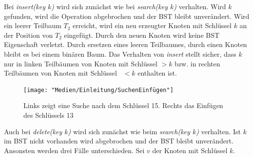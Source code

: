\documentclass[a4paper,12pt]{article}
\begin{document}
Bei \textit{insert(key $k$)} wird sich zunächst wie bei  \textit{search(key $k$)} verhalten. Wird $k$ gefunden, wird die Operation abgebrochen und der BST bleibt unverändert. Wird ein leerer Teilbaum $T_2$ erreicht, wird ein neu erzeugter Knoten mit Schlüssel $k$ an der Position von $T_2$ eingefügt. Durch den neuen Knoten wird keine BST Eigenschaft verletzt. Durch ersetzen eines leeren Teilbaumes, durch einen Knoten bleibt es bei einem binären Baum. Das Verhalten von  \textit{insert} stellt sicher, dass $k$ nur in linken Teilbäumen von Knoten mit Schlüssel $> k$ bzw. in rechten Teilbäumen von Knoten mit Schlüssel~ $< k$ enthalten ist.    \\
\begin{figure}[h]
	\centering
	\texttt{[image: "Medien/Einleitung/SuchenEinfügen"]}
	\caption{Links zeigt eine Suche nach dem Schlüssel 15. Rechts das Einfügen des Schlüssels 13}
	\label{fig:SuchenEinfügen}
\end{figure}
\noindent Auch bei \textit{delete(key $k$)} wird sich zunächst wie beim  \textit{search(key $k$)} verhalten. Ist $k$ im BST nicht vorhanden wird abgebrochen und der BST bleibt unverändert. Ansonsten werden drei Fälle unterschieden.
Sei $v$ der Knoten mit Schlüssel $k$.
\end{document}
